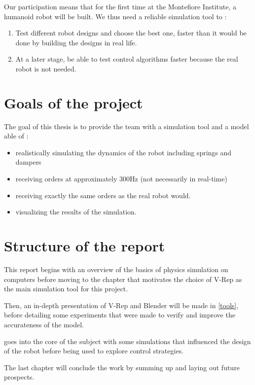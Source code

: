 Our participation means that for the first time at the Montefiore Institute, a humanoid robot will be built. We thus need a reliable simulation tool to :
\begin{enumerate}
\item Test different robot designs and choose the best one, faster than it would be done by building the designs in real life.
\item At a later stage, be able to test control algorithms faster because the real robot is not needed.
\end{enumerate}

\section{Goals of the project}
The goal of this thesis is to provide the team with a simulation tool and a model able of :
\begin{itemize}
\item realistically simulating the dynamics of the robot including springs and dampers
\item receiving orders at approximately 300Hz (not necessarily in real-time)
\item receiving exactly the same orders as the real robot would.
\item visualizing the results of the simulation.
\end{itemize}

\section{Structure of the report}
This report begins with an overview of the basics of physics simulation on computers before moving to the chapter that motivates the choice of V-Rep as the main simulation tool for this project.

Then, an in-depth presentation of V-Rep and Blender will be made in \cref{tools}, before detailing some experiments that were made to verify and improve the accurateness of the model.

 goes into the core of the subject with some simulations that influenced the design of the robot before being used to explore control strategies.

The last chapter will conclude the work by summing up and laying out future prospects.